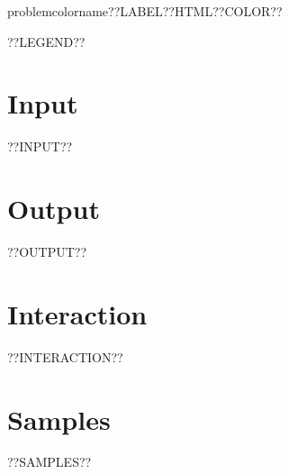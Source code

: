 \renewcommand\problemlabel{??LABEL??}
\renewcommand\problemcolor{??COLOR??}
\renewcommand\problemtitle{??TITLE??}
\renewcommand\timelimit{??TIMELIMIT??}
\renewcommand\memorylimit{??MEMORYLIMIT??}

\renewcommand\problemcolorname{problemcolorname\problemlabel}
\definecolor\problemcolorname{HTML}{\problemcolor}

\pagestyle{problem}

\problemheader

??LEGEND??

\section*{Input}
??INPUT??

\section*{Output}
??OUTPUT??

\section*{Interaction}
??INTERACTION??

\section*{Samples}
??SAMPLES??
